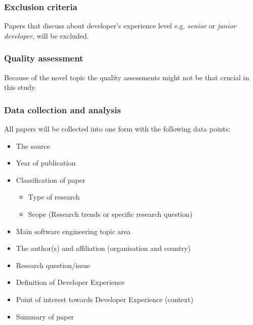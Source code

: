 \documentclass[english, 12pt, a4paper, sci, utf8, a-1b, online]{aaltothesis}
\begin{document}
\subsubsection{Exclusion criteria}

Papers that discuss about developer's experience level e.g. \textit{senior} or \textit{junior developer}, will be excluded.


\subsubsection{Quality assessment}

Because of the novel topic the quality assessments might not be that crucial in this study.

\subsubsection{Data collection and analysis}

All papers will be collected into one form with the following data points:

\begin{itemize}
  \item The source
  \item Year of publication
  \item Classification of paper
        \begin{itemize}
          \item Type of research
          \item Scope (Research trends or specific research question)
        \end{itemize}
  \item Main software engineering topic area
  \item The author(s) and affiliation (organisation and country)
  \item Research question/issue
  \item Definition of Developer Experience
  \item Point of interest towards Developer Experience (context)
  \item Summary of paper
\end{itemize}
\end{document}
